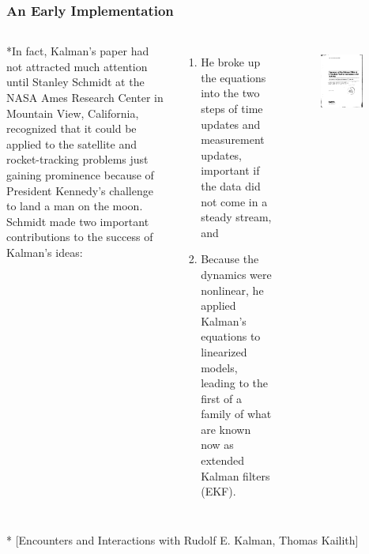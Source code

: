 \begin{frame}
   \frametitle{An Early Implementation}
   
   		\begin{columns}
            *In fact, Kalman’s paper had not attracted much attention until Stanley Schmidt at the NASA Ames Research Center in Mountain View, California, recognized that it could be applied to the satellite and rocket-tracking problems just gaining prominence because of President Kennedy’s challenge to land a man on the moon. Schmidt made two important contributions to the success of Kalman’s ideas: 
            \begin{enumerate}
                \item He broke up the equations into the two steps of time updates and measurement updates, important if the data did not come in a steady stream, and
                \item Because the dynamics were nonlinear, he applied Kalman’s equations to linearized models, leading to the first of a family of what are known now as extended Kalman filters (EKF).
            \end{enumerate}
			
		
			\begin{figure}
				\centering
					\includegraphics[width=0.80\textwidth]{Figures/Part3/Discovery of the Kalman Filter as a Practical Tool for Aerospace and Industry - NASA - Cover.pdf}
				\label{fig:Schmit_NASA}
			\end{figure}
		\end{columns}

\vspace{10pt}
    * {\tiny[Encounters and Interactions with Rudolf E. Kalman, Thomas Kailith]}
\end{frame}


